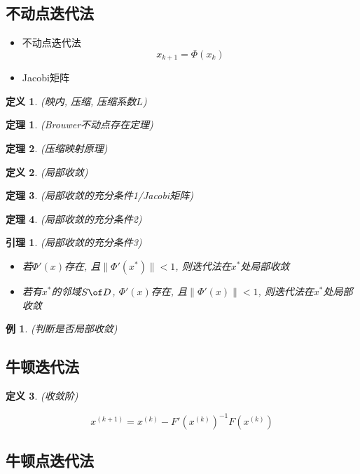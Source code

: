 \documentclass[twoside]{article}
\newtheorem{theorem}{定理}[section]
\newtheorem{lemma}{引理}[section]
\newtheorem{definition}{定义}[section]
\newtheorem{eg}{例}[section]
\begin{document}
\subsection{不动点迭代法}
\begin{itemize}
  \item 不动点迭代法
    \begin{equation}
      x_{k+1}=\Phi(x_k)
    \end{equation}
  \item Jacobi矩阵
\end{itemize}
\begin{definition}
  (映内, 压缩, 压缩系数$L$)
\end{definition}
\begin{theorem}
  (Brouwer不动点存在定理)
\end{theorem}
\begin{theorem}
  (压缩映射原理)
\end{theorem}
\begin{definition}
  (局部收敛)
\end{definition}
\begin{theorem}
  (局部收敛的充分条件1/Jacobi矩阵)
\end{theorem}
\begin{theorem}
  (局部收敛的充分条件2)
\end{theorem}
\begin{lemma}
  (局部收敛的充分条件3)
  \begin{itemize}
    \item 若$\Phi'(x)$存在, 且$\|\Phi'(x^*)\|<1$, 则迭代法在$x^*$处局部收敛
    \item 若有$x^*$的邻域$S\of D$, $\Phi'(x)$存在, 且$\|\Phi'(x)\|<1$, 则迭代法在$x^*$处局部收敛
  \end{itemize}
\end{lemma}
\begin{eg}
  (判断是否局部收敛)
\end{eg}
\subsection{牛顿迭代法}
\begin{definition}
  (收敛阶)
\end{definition}
\begin{equation}
  x^{(k+1)} = x^{(k)} - F'(x^{(k)})^{-1} F(x^{(k)})
\end{equation}

\subsection{牛顿点迭代法}
\end{document}
